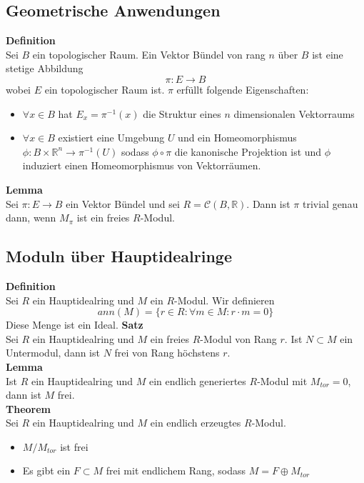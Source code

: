 \documentclass[a4paper, 12pt]{article}
\begin{document}
\subsection{Geometrische Anwendungen}
\textbf{Definition}\\
Sei $B$ ein topologischer Raum. Ein Vektor Bündel von rang $n$ über $B$ ist eine stetige Abbildung \[\pi: E \to B\] wobei $E$ ein topologischer Raum ist. $\pi$ erfüllt folgende Eigenschaften: \begin{itemize}
	\item $\forall x \in B$ hat $E_x = \pi^{-1}(x)$ die Struktur eines $n$ dimensionalen Vektorraums
	\item $\forall x \in B$ existiert eine Umgebung $U$ und ein Homeomorphismus $\phi: B \times \mathbb{R}^n \to \pi^{-1}(U)$ sodass $\phi \circ \pi$ die kanonische Projektion ist und $\phi$ induziert einen Homeomorphismus von Vektorräumen.
\end{itemize}
\textbf{Lemma}\\
Sei $\pi: E \to B$ ein Vektor Bündel und sei $R = \mathcal{C}(B,\mathbb{R})$. Dann ist $\pi$ trivial genau dann, wenn $M_\pi$ ist ein freies $R$-Modul. 
\subsection{Moduln über Hauptidealringe}
\textbf{Definition}\\
Sei $R$ ein Hauptidealring und $M$ ein $R$-Modul. Wir definieren \[ann(M) = \{r \in R: \forall m \in M: r\cdot m = 0\}\]
Diese Menge ist ein Ideal.
\textbf{Satz}\\
Sei $R$ ein Hauptidealring und $M$ ein freies $R$-Modul von Rang $r$. Ist $N\subset M$ ein Untermodul, dann ist $N$ frei von Rang höchstens $r$.\\
\textbf{Lemma}\\
Ist $R$ ein Hauptidealring und $M$ ein endlich generiertes $R$-Modul mit $M_{tor} = 0$, dann ist $M$ frei.\\
\textbf{Theorem}\\
Sei $R$ ein Hauptidealring und $M$ ein endlich erzeugtes $R$-Modul. \begin{itemize}
	\item $M/M_{tor}$ ist frei
	\item Es gibt ein $F \subset M$ frei mit endlichem Rang, sodass $M = F\oplus M_{tor}$
\end{itemize}
\end{document}
